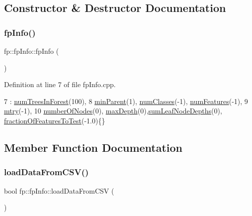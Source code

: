 \subsection{Constructor \& Destructor Documentation}
\mbox{\label{classfp_1_1fpInfo_a2a0f7c8215dd138b690efe8a03484aef}} 
\subsubsection{\texorpdfstring{fp\+Info()}{fpInfo()}}
{\footnotesize\ttfamily fp\+::fp\+Info\+::fp\+Info (\begin{DoxyParamCaption}{ }\end{DoxyParamCaption})}



Definition at line 7 of file fp\+Info.\+cpp.


\begin{DoxyCode}
7                   : \hyperlink{classfp_1_1fpInfo_a8dbd62dca5c972c29d29a69d90ca2632}{numTreesInForest}(100),
8     \hyperlink{classfp_1_1fpInfo_a128fab7ba6da0fc76da00b48bb1bd7d5}{minParent}(1),  \hyperlink{classfp_1_1fpInfo_a1c98a9ced12230f21003f78d742625a3}{numClasses}(-1), \hyperlink{classfp_1_1fpInfo_a6ed8deabebae772fc213730cd29a2e61}{numFeatures}(-1),
9     \hyperlink{classfp_1_1fpInfo_a62cccc1eb5641ebec2a6cc86cf03eedf}{mtry}(-1), 
10     \hyperlink{classfp_1_1fpInfo_a9404de3ad49dc78e3d5c8e3ef8b04fba}{numberOfNodes}(0), \hyperlink{classfp_1_1fpInfo_a95c744fa049788dd61fa0fccdec4565d}{maxDepth}(0),\hyperlink{classfp_1_1fpInfo_a13afa17097728f059e8525ea382b71cd}{sumLeafNodeDepths}(0), 
      \hyperlink{classfp_1_1fpInfo_ab949cb97523283367e9b120fd78e3c3b}{fractionOfFeaturesToTest}(-1.0)\{\}
\end{DoxyCode}


\subsection{Member Function Documentation}
\mbox{\label{classfp_1_1fpInfo_a2a6ac3cfea5db5842baa1789468492ad}} 
\subsubsection{\texorpdfstring{load\+Data\+From\+C\+S\+V()}{loadDataFromCSV()}}
{\footnotesize\ttfamily bool fp\+::fp\+Info\+::load\+Data\+From\+C\+SV (\begin{DoxyParamCaption}{ }\end{DoxyParamCaption})\hspace{0.3cm}{\ttfamily [inline]}}



